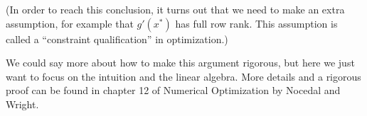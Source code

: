 \documentclass{article}
\begin{document}
(In order to reach this conclusion, it turns out that we need to make an extra assumption,
for example that $g'(x^*)$ has full row rank.  This assumption is called a ``constraint qualification''
in optimization.)

We could say more about how to make this argument rigorous, but here we just
want to focus on the intuition and the linear algebra.
More details and a rigorous proof can be found in chapter 12 of Numerical Optimization
by Nocedal and Wright. 
\end{document}
